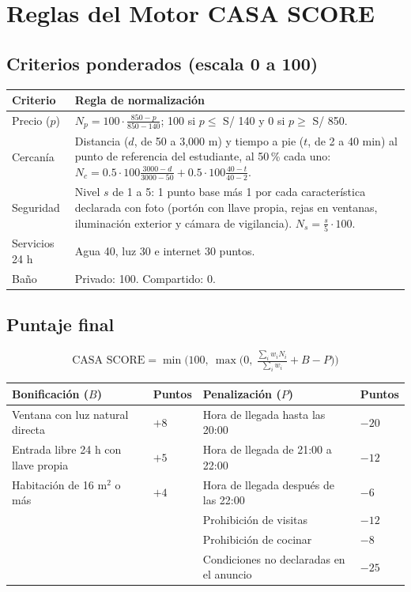 \documentclass[11pt,a4paper]{article}
\begin{document}
\section{Reglas del Motor CASA SCORE}

\subsection{Criterios ponderados (escala 0 a 100)}
{\small
\noindent\begin{tabularx}{\textwidth}{@{}P{2.4cm} L@{}}
\toprule
{}
\textbf{Criterio} & \textbf{Regla de normalización} \\
\midrule
Precio ($p$) & $N_p = 100 \cdot \frac{850 - p}{850 - 140}$; 100 si $p \le$ S/ 140 y 0 si $p \ge$ S/ 850. \\
Cercanía & Distancia ($d$, de 50 a 3,000 m) y tiempo a pie ($t$, de 2 a 40 min) al punto de referencia del estudiante, al 50\,\% cada uno: $N_c = 0.5 \cdot 100\frac{3000-d}{3000-50} + 0.5 \cdot 100\frac{40-t}{40-2}$. \\
Seguridad & Nivel $s$ de 1 a 5: 1 punto base más 1 por cada característica declarada con foto (portón con llave propia, rejas en ventanas, iluminación exterior y cámara de vigilancia). $N_s = \frac{s}{5} \cdot 100$. \\
Servicios 24 h & Agua 40, luz 30 e internet 30 puntos. \\
Baño & Privado: 100. Compartido: 0. \\
\bottomrule
\end{tabularx}
}

\subsection{Puntaje final}
\[
\text{CASA SCORE} = \min\Big(100,\ \max\big(0,\ \tfrac{\sum_i w_i N_i}{\sum_i w_i} + B - P\big)\Big)
\]

{\small
\noindent\begin{tabularx}{\textwidth}{@{}L C{1.6cm} L C{1.6cm}@{}}
\toprule
{}
\textbf{Bonificación ($B$)} & \textbf{Puntos} & \textbf{Penalización ($P$)} & \textbf{Puntos} \\
\midrule
Ventana con luz natural directa & $+8$ & Hora de llegada hasta las 20:00 & $-20$ \\
Entrada libre 24 h con llave propia & $+5$ & Hora de llegada de 21:00 a 22:00 & $-12$ \\
Habitación de 16 m$^2$ o más & $+4$ & Hora de llegada después de las 22:00 & $-6$ \\
& & Prohibición de visitas & $-12$ \\
& & Prohibición de cocinar & $-8$ \\
& & Condiciones no declaradas en el anuncio & $-25$ \\
\bottomrule
\end{tabularx}
}
\end{document}
